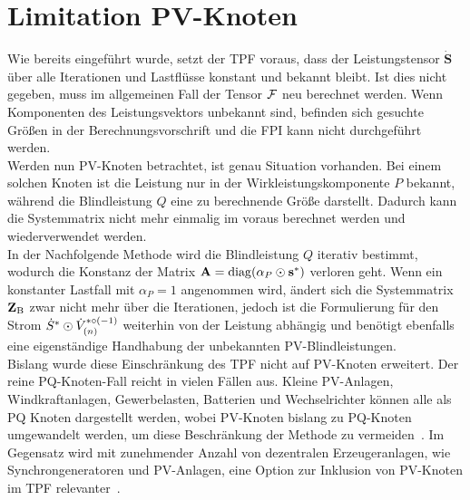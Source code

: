 \section{Limitation PV-Knoten}
\label{sec:tpf_limitation}
\label{subsec:tpf_annahme}




Wie bereits eingeführt wurde, setzt der TPF voraus, dass der Leistungstensor $\dot{\mathbf{S}}$ über alle Iterationen und Lastflüsse konstant und bekannt bleibt.
Ist dies nicht gegeben, muss im allgemeinen Fall der Tensor $\mathcal{F}$ neu berechnet werden.
Wenn Komponenten des Leistungsvektors unbekannt sind, befinden sich gesuchte Größen in der Berechnungsvorschrift und die FPI kann nicht durchgeführt werden.\\

Werden nun PV-Knoten betrachtet, ist genau Situation vorhanden.
Bei einem solchen Knoten ist die Leistung nur in der Wirkleistungskomponente $P$ bekannt, während die Blindleistung $Q$ eine zu berechnende Größe darstellt.
Dadurch kann die Systemmatrix nicht mehr einmalig im voraus berechnet werden und wiederverwendet werden.\\

In der Nachfolgende Methode wird die Blindleistung $Q$ iterativ bestimmt, wodurch die Konstanz der Matrix $\mathbf{A} = \operatorname{diag}(\alpha_P \odot \mathbf{s}^*)$ verloren geht. 
Wenn ein konstanter Lastfall mit $\alpha_P = 1$ angenommen wird, ändert sich die Systemmatrix $\mathbf{Z}_\mathrm{B}$ zwar nicht mehr über die Iterationen, jedoch ist die Formulierung für den Strom $\dot{S}^* \odot \dot{V}_{(n)}^{*{\circ(-1)}}$ weiterhin von der Leistung abhängig und benötigt ebenfalls eine eigenständige Handhabung der unbekannten PV-Blindleistungen.\\

Bislang wurde diese Einschränkung des TPF nicht auf PV-Knoten erweitert. 
Der reine PQ-Knoten-Fall reicht in vielen Fällen aus.
Kleine PV-Anlagen, Windkraftanlagen, Gewerbelasten, Batterien und  Wechselrichter können alle als PQ Knoten dargestellt werden, wobei PV-Knoten bislang zu PQ-Knoten umgewandelt werden, um diese Beschränkung der Methode zu vermeiden~\cite{Salazar2024}.
Im Gegensatz wird mit zunehmender Anzahl von dezentralen Erzeugeranlagen, wie Synchrongeneratoren und PV-Anlagen, eine Option zur Inklusion von PV-Knoten im TPF relevanter~\cite{Ghiani2015,Wang2019}. 






